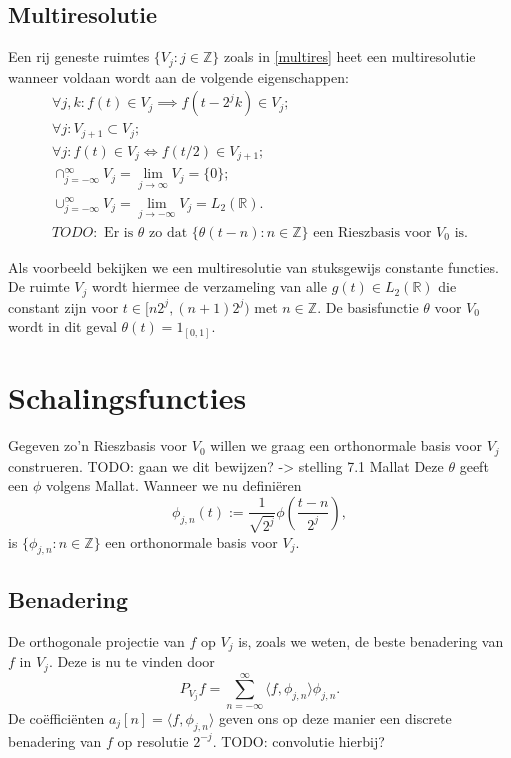 \documentclass[11pt]{amsart}
\newcommand{\R}{\mathbb{R}}
\newcommand{\Z}{\mathbb{Z}}
\begin{document}
\subsection{Multiresolutie}
Een rij geneste ruimtes $\{ V_j: j \in \Z \}$ zoals in \eqref{multires} heet een multiresolutie wanneer voldaan wordt aan de volgende eigenschappen:
\[
\begin{array}{c}
  \forall j, k: f(t) \in V_j \implies f(t - 2^j k) \in V_j; \\
  \forall j: V_{j+1} \subset V_j; \\
  \forall j: f(t) \in V_j \iff f(t/2) \in V_{j+1}; \\
  \cap_{j=-\infty}^{\infty} V_{j} = \lim_{j\to\infty} V_j = \{0\}; \\
  \cup_{j=-\infty}^{\infty} V_j = \lim_{j\to-\infty} V_j = L_2(\R). \\
  TODO: \text{ Er is $\theta$ zo dat $\{ \theta(t-n): n \in \Z \}$ een Rieszbasis voor $V_0$ is.}
\end{array}
\]

Als voorbeeld bekijken we een multiresolutie van stuksgewijs constante functies. De ruimte $V_j$ wordt hiermee de verzameling van alle $g(t) \in L_2(\R)$ die constant zijn voor $t \in [n 2^j, (n+1)2^j)$ met $n \in \Z$. De basisfunctie $\theta$ voor $V_0$ wordt in dit geval $\theta(t) = 1_{[0,1]}$.

\section{Schalingsfuncties}
Gegeven zo'n Rieszbasis voor $V_0$ willen we graag een orthonormale basis voor $V_j$ construeren. 
TODO: gaan we dit bewijzen? -> stelling 7.1 Mallat
Deze $\theta$ geeft een $\phi$ volgens Mallat. Wanneer we nu defini\"eren
\[
  \phi_{j,n}(t) := \frac{1}{\sqrt{2^j}} \phi\left( \frac{t-n}{2^j} \right),
\]
is $\{ \phi_{j,n}: n \in \Z \}$ een orthonormale basis voor $V_j$.

\subsection{Benadering} De orthogonale projectie van $f$ op $V_j$ is, zoals we weten, de beste benadering van $f$ in $V_j$. Deze is nu te vinden door
\[
	P_{V_j} f = \sum_{n=-\infty}^\infty \langle f, \phi_{j,n} \rangle \phi_{j,n}.
\]
De co\"effici\"enten $a_j[n] = \langle f, \phi_{j,n} \rangle$ geven ons op deze manier een discrete benadering van $f$ op resolutie $2^{-j}$. TODO: convolutie hierbij?
\end{document}
